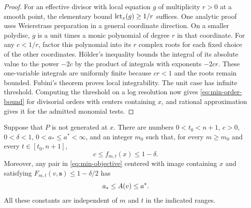 \begin{proof}
For an effective divisor with local equation $g$ of multiplicity $r>0$
at a smooth point, the elementary bound
$\operatorname{lct}_x(g)\geq1/r$ suffices. One analytic proof uses Weierstrass
preparation in a general coordinate direction. On a smaller
polydisc, $g$ is a unit times a monic polynomial of degree $r$ in that
coordinate. For any $c<1/r$, factor this polynomial into its $r$
complex roots for each fixed choice of the other coordinates. H\"older's
inequality bounds the integral of its absolute value to the power
$-2c$ by the product of integrals with exponents $-2cr$. These
one-variable integrals are uniformly finite because $cr<1$ and the
roots remain bounded. Fubini's theorem proves local integrability.
The unit case has infinite threshold. Computing the threshold on a
log resolution now gives \eqref{eq:min-order-bound} for divisorial
orders with centers containing $x$, and rational approximation gives
it for the admitted monomial tests.
\end{proof}

\begin{lemma}
\label{lem:min-coercivity}
Suppose that $P$ is not generated at $x$. There are numbers
$0<t_0<n+1$, $c>0$, $0<\delta<1$, $0<a_*\leq a^*<\infty$, and
an integer $m_0$ such that, for every $m\geq m_0$ and every
$t\in[t_0,n+1]$,
\begin{equation}
\label{eq:min-uniform-bounds}
 c\leq f_{m,t}(x)\leq1-\delta.
\end{equation}
Moreover, any pair in \eqref{eq:min-objective} centered with image
containing $x$ and satisfying
$F_{m,t}(v,\mathbf s)\leq1-\delta/2$ has
\begin{equation}
\label{eq:min-discrepancy-bounds}
 a_*\leq A(v)\leq a^*.
\end{equation}
All these constants are independent of $m$ and $t$ in the indicated
ranges.
\end{lemma}

